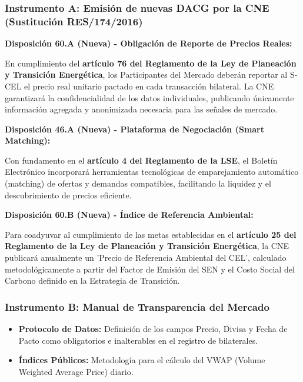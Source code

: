 \documentclass{cel}
\begin{document}
\subsubsection{Instrumento A: Emisión de nuevas DACG por la CNE (Sustitución RES/174/2016)}
\nopagebreak

\textbf{Disposición 60.A (Nueva) - Obligación de Reporte de Precios Reales:}

\textquotedbl{}En cumplimiento del \textbf{artículo 76 del Reglamento de la Ley de Planeación y Transición Energética}, los Participantes del Mercado deberán reportar al S-CEL el precio real unitario pactado en cada transacción bilateral. La CNE garantizará la confidencialidad de los datos individuales, publicando únicamente información agregada y anonimizada necesaria para las señales de mercado.\textquotedbl{}


\textbf{Disposición 46.A (Nueva) - Plataforma de Negociación (Smart Matching):}

\textquotedbl{}Con fundamento en el \textbf{artículo 4 del Reglamento de la LSE}, el Boletín Electrónico incorporará herramientas tecnológicas de emparejamiento automático (matching) de ofertas y demandas compatibles, facilitando la liquidez y el descubrimiento de precios eficiente.\textquotedbl{}


\textbf{Disposición 60.B (Nueva) - Índice de Referencia Ambiental:}

\textquotedbl{}Para coadyuvar al cumplimiento de las metas establecidas en el \textbf{artículo 25 del Reglamento de la Ley de Planeación y Transición Energética}, la CNE publicará anualmente un 'Precio de Referencia Ambiental del CEL', calculado metodológicamente a partir del Factor de Emisión del SEN y el Costo Social del Carbono definido en la Estrategia de Transición.\textquotedbl{}


\subsubsection{Instrumento B: Manual de Transparencia del Mercado}
\nopagebreak

\begin{itemize}
\item \textbf{Protocolo de Datos:} Definición de los campos \textquotedbl{}Precio\textquotedbl{}, \textquotedbl{}Divisa\textquotedbl{} y \textquotedbl{}Fecha de Pacto\textquotedbl{} como obligatorios e inalterables en el registro de bilaterales.
\item \textbf{Índices Públicos:} Metodología para el cálculo del VWAP (Volume Weighted Average Price) diario.

\end{itemize}
\end{document}
